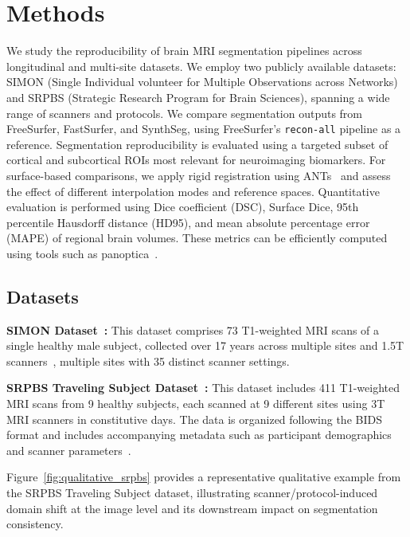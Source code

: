 \documentclass{midl} %
\begin{document}
\section{Methods}

We study the reproducibility of brain MRI segmentation pipelines across longitudinal and multi-site datasets. We employ two publicly available datasets: SIMON (Single Individual volunteer for Multiple Observations across Networks) and SRPBS (Strategic Research Program for Brain Sciences), spanning a wide range of scanners and protocols. We compare segmentation outputs from FreeSurfer, FastSurfer, and SynthSeg, using FreeSurfer's \texttt{recon-all} pipeline as a reference. Segmentation reproducibility is evaluated using a targeted subset of cortical and subcortical ROIs most relevant for neuroimaging biomarkers. For surface-based comparisons, we apply rigid registration using ANTs~\cite{Avants2011} and assess the effect of different interpolation modes and reference spaces. Quantitative evaluation is performed using Dice coefficient (DSC), Surface Dice, 95th percentile Hausdorff distance (HD95), and mean absolute percentage error (MAPE) of regional brain volumes. These metrics can be efficiently computed 
using tools such as panoptica~\cite{panoptica2024}.

\subsection{Datasets}

\textbf{SIMON Dataset~\citep{duchesne2019canadian}:} This dataset comprises 73 T1-weighted MRI scans of a single healthy male subject, collected over 17 years across multiple sites and 1.5T scanners~\citep{duchesne2019canadian}, multiple sites with 35 distinct scanner settings.

\textbf{SRPBS Traveling Subject Dataset~\citep{tanaka2021multi}:} This dataset includes 411 T1-weighted MRI scans from 9 healthy subjects, each scanned at 9 different sites using 3T MRI scanners in constitutive days. The data is organized following the BIDS format and includes accompanying metadata such as participant demographics and scanner parameters~\citep{tanaka2021multi}.

Figure~\ref{fig:qualitative_srpbs} provides a representative qualitative example from the SRPBS Traveling Subject dataset, illustrating scanner/protocol-induced domain shift at the image level and its downstream impact on segmentation consistency. 
\end{document}
